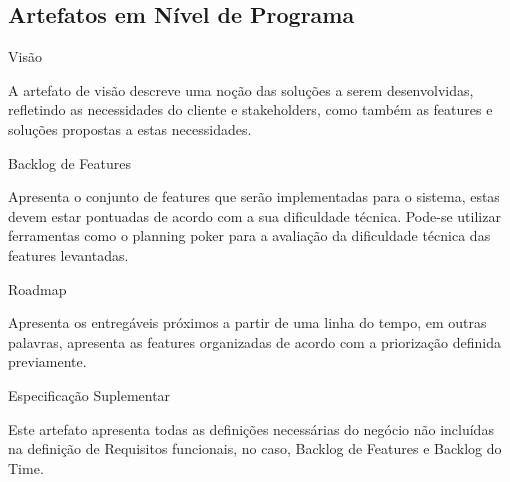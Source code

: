 {\large{\subsection {Artefatos em Nível de Programa \\}}}
\begin{itemize}

{
    \large{\item Visão \\}

    \tab A artefato de visão descreve uma noção das soluções a serem desenvolvidas, refletindo as necessidades do cliente e stakeholders, como também as features e soluções propostas a estas necessidades. \\
}


{
    \large{\item Backlog de Features \\}

    \tab Apresenta o conjunto de features que serão implementadas para o sistema, estas devem estar pontuadas de acordo com a sua dificuldade técnica. Pode-se utilizar ferramentas como o planning poker para a avaliação da dificuldade técnica das features levantadas. \\
}

{
    \large{\item Roadmap \\}

    \tab Apresenta os entregáveis próximos a partir de uma linha do tempo, em outras palavras, apresenta as features organizadas de acordo com a priorização definida previamente. \\
}

{
    \large{\item Especificação Suplementar\\}

    \tab Este artefato apresenta todas as definições necessárias do negócio não incluídas na definição de Requisitos funcionais, no caso, Backlog de Features e Backlog do Time. \\
}
\end{itemize}

